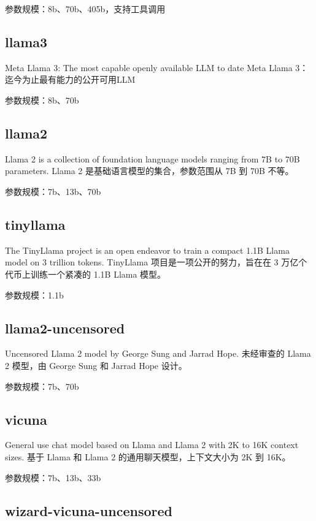 \documentclass[12pt,UTF8]{ctexbook}
\begin{document}
参数规模：8b、70b、405b，支持工具调用

\subsection{llama3}

Meta Llama 3: The most capable openly available LLM to date
Meta Llama 3：迄今为止最有能力的公开可用LLM

参数规模：8b、70b

\subsection{llama2}

Llama 2 is a collection of foundation language models ranging from 7B to 70B parameters.
Llama 2 是基础语言模型的集合，参数范围从 7B 到 70B 不等。

参数规模：7b、13b、70b

\subsection{tinyllama}

The TinyLlama project is an open endeavor to train a compact 1.1B Llama model on 3 trillion tokens.
TinyLlama 项目是一项公开的努力，旨在在 3 万亿个代币上训练一个紧凑的 1.1B Llama 模型。

参数规模：1.1b

\subsection{llama2-uncensored}

Uncensored Llama 2 model by George Sung and Jarrad Hope.
未经审查的 Llama 2 模型，由 George Sung 和 Jarrad Hope 设计。

参数规模：7b、70b

\subsection{vicuna}

General use chat model based on Llama and Llama 2 with 2K to 16K context sizes.
基于 Llama 和 Llama 2 的通用聊天模型，上下文大小为 2K 到 16K。

参数规模：7b、13b、33b

\subsection{wizard-vicuna-uncensored}
\end{document}
